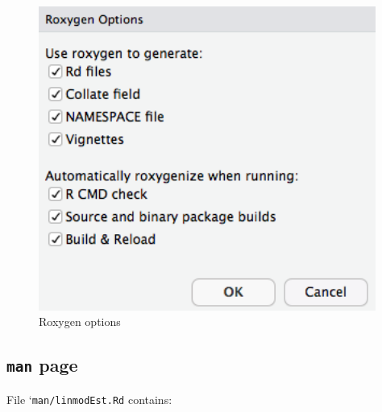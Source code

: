 \documentclass[]{book}
\theoremstyle{definition}
\theoremstyle{definition}
\theoremstyle{definition}
\theoremstyle{remark}
\begin{document}
\begin{figure}

{\centering \includegraphics[width=4.35in]{images/ch3_configure_build_tools} 

}

\caption{Roxygen options}\label{fig:pkg8}
\end{figure}

\subsection{\texorpdfstring{\texttt{man}
page}{man page}}\label{man-page}

File `\texttt{man/linmodEst.Rd} contains:
\end{document}
